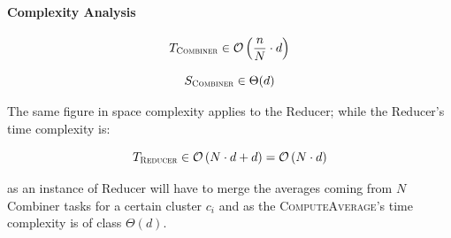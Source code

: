 \documentclass[parskip=full]{report}
\begin{document}


%

\paragraph{Complexity Analysis}

\[
T_\textsc{Combiner} \in \mathcal{O}\left(\dfrac{n}{N} \cdot d\right)
\]


\[
S_\textsc{Combiner} \in \Theta(d)
\]

The same figure in space complexity applies to the Reducer; while the 
Reducer's time complexity is:

\[
T_\textsc{Reducer} \in \mathcal{O}\left(N \cdot d + d\right) = 
\mathcal{O}\left(N \cdot d\right)
\]

as an instance of Reducer will have to merge the averages coming from $N$ 
Combiner tasks for a certain cluster $c_i$ and as the 
\textsc{ComputeAverage}'s time complexity is of class $\Theta(d)$.
\end{document}

